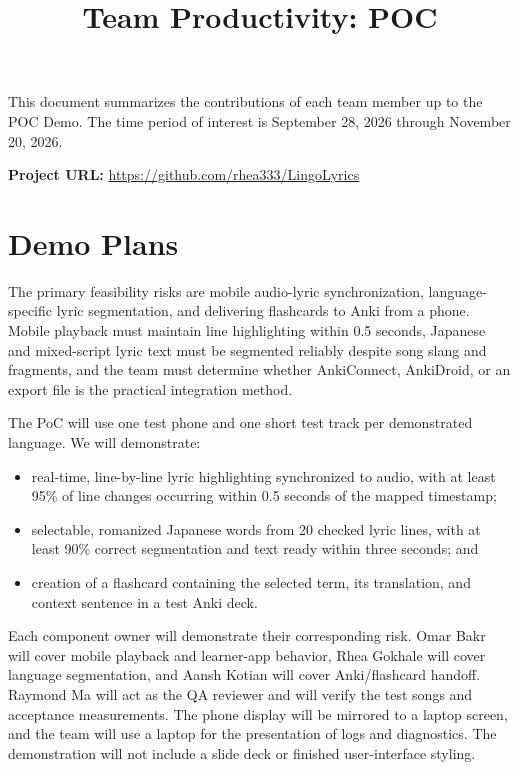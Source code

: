 \documentclass{article}
\title{Team Productivity: POC\\\progname}
\author{\authname}
\date{}
\begin{document}
\maketitle

This document summarizes the contributions of each team member up to the POC
Demo.  The time period of interest is September 28, 2026 through November 20,
2026.

\noindent \textbf{Project URL: }
\url{https://github.com/rhea333/LingoLyrics}

\section{Demo Plans}

The primary feasibility risks are mobile audio-lyric synchronization,
language-specific lyric segmentation, and delivering flashcards to Anki from
a phone.  Mobile playback must maintain line highlighting within 0.5 seconds,
Japanese and mixed-script lyric text must be segmented reliably despite song
slang and fragments, and the team must determine whether AnkiConnect,
AnkiDroid, or an export file is the practical integration method.

The PoC will use one test phone and one short test track per demonstrated
language.  We will demonstrate:
\begin{itemize}
    \item real-time, line-by-line lyric highlighting synchronized to audio,
    with at least 95\% of line changes occurring within 0.5 seconds of the
    mapped timestamp;
    \item selectable, romanized Japanese words from 20 checked lyric lines,
    with at least 90\% correct segmentation and text ready within three
    seconds; and
    \item creation of a flashcard containing the selected term, its translation,
    and context sentence in a test Anki deck.
\end{itemize}

Each component owner will demonstrate their corresponding risk.  Omar Bakr will
cover mobile playback and learner-app behavior, Rhea Gokhale will cover
language segmentation, and Aansh Kotian will cover Anki/flashcard handoff.
Raymond Ma will act as the QA reviewer and will verify the test songs and
acceptance measurements.  The phone display will be mirrored to a laptop
screen, and the team will use a laptop for the presentation of logs and
diagnostics.  The demonstration will not include a slide deck or finished
user-interface styling.
\end{document}
